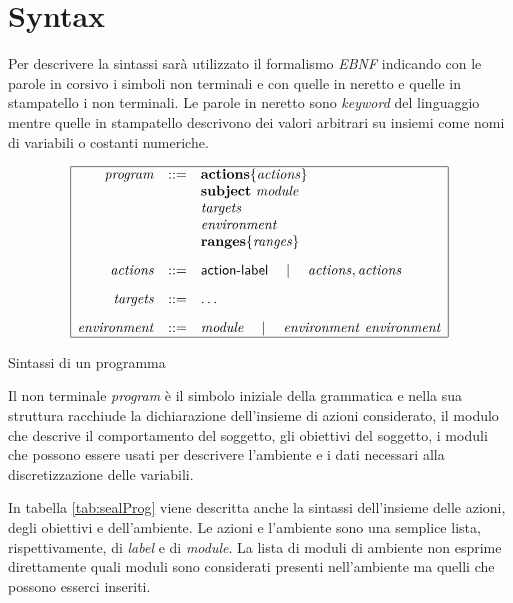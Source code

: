 \section{Syntax}
Per descrivere la sintassi \seal{} sarà utilizzato il formalismo \emph{EBNF} indicando con le parole in corsivo i simboli non terminali e con quelle in neretto e quelle in stampatello i non terminali. Le parole in neretto sono \emph{keyword} del linguaggio mentre quelle in stampatello descrivono dei valori arbitrari su insiemi come nomi di variabili o costanti numeriche.

\begin{table} %
$$
\begin{array}{|rcl|}
\hline
\mathit{program} &::=& \mathbf{actions} \{ \mathit{actions} \} \\
	&& \mathbf{subject} \mbox{ } \mathit{module} \\
	&& \mathit{targets} \\
	&& \mathit{environment} \\
	&& \mathbf{ranges} \{ \mathit{ranges} \}
	\\[.3cm]
\mathit{actions} &::=& {\sf action}\textrm{-}{\sf label} \quad\mid\quad \mathit{actions} , \mathit{actions}
	\\[.3cm]
\mathit{targets} &::=& \dots
	\\[.3cm]	
\mathit{environment} &::=& \mathit{module} \quad\mid\quad \mathit{environment} \mbox{ } \mathit{environment} 
	\\
\hline
\end{array}
$$
\label{tab:sealProg} %
\caption{Sintassi di un programma \seal{}}
\end{table}

Il non terminale \emph{program} è il simbolo iniziale della grammatica e nella sua struttura racchiude la dichiarazione dell'insieme di azioni considerato, il modulo che descrive il comportamento del soggetto, gli obiettivi del soggetto, i moduli che possono essere usati per descrivere l'ambiente e i dati necessari alla discretizzazione delle variabili.

In tabella \ref{tab:sealProg} viene descritta anche la sintassi dell'insieme delle azioni, degli obiettivi e dell'ambiente. Le azioni e l'ambiente sono una semplice lista, rispettivamente, di \emph{label} e di \emph{module}. La lista di moduli di ambiente non esprime direttamente quali moduli sono considerati presenti nell'ambiente ma quelli che possono esserci inseriti.

